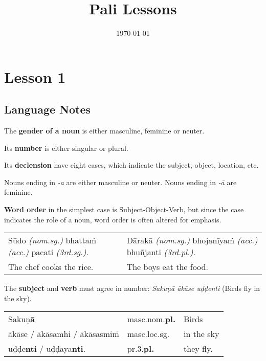 \documentclass[11pt,oneside]{memoir}
\date{\today}
\title{Pali Lessons}
\begin{document}
\maketitle

\chapter{Lesson 1}
\label{sec:org14d43f1}
\section{Language Notes}
\label{sec:org9a257d9}

The \textbf{gender of a noun} is either masculine, feminine or neuter.

Its \textbf{number} is either singular or plural.

Its \textbf{declension} have eight cases, which indicate the subject, object, location, etc.

Nouns ending in \emph{-a} are either masculine or neuter. Nouns ending in \emph{-ā} are feminine.

\textbf{Word order} in the simplest case is Subject-Object-Verb, but since the case indicates the role of a noun, word order is often altered for emphasis.

\begin{center}
\begin{tabular}{ll}
Sūdo \emph{(nom.sg.)} bhattaṁ \emph{(acc.)} pacati \emph{(3rd.sg.)}. & Dārakā \emph{(nom.sg.)} bhojanīyaṁ \emph{(acc.)} bhuñjanti \emph{(3rd.pl.)}.\\[0pt]
The chef cooks the rice. & The boys eat the food.\\[0pt]
\end{tabular}
\end{center}

The \textbf{subject} and \textbf{verb} must agree in number: \emph{Sakuṇā ākāse uḍḍenti} (Birds fly in the sky).

\begin{center}
\begin{tabular}{lll}
Sakuṇ\textbf{ā} & masc.nom.\textbf{pl.} & Birds\\[0pt]
ākāse / ākāsamhi / ākāsasmiṁ & masc.loc.sg. & in the sky\\[0pt]
uḍḍe\textbf{nti} / uḍḍaya\textbf{nti}. & pr.3.\textbf{pl.} & they fly.\\[0pt]
\end{tabular}
\end{center}
\end{document}

